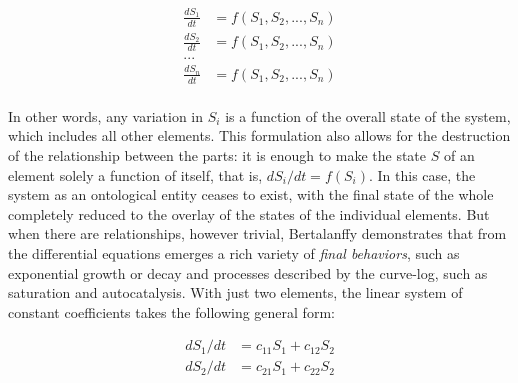 \documentclass[./main_en.tex]{subfiles}
\begin{document}
\begin{linenomath*}
\begin{equation}
\label{eq:systems}
\begin{split}
    \frac{dS_1}{dt} &= f(S_1, S_2, ..., S_n)\\
    \frac{dS_2}{dt} &= f(S_1, S_2, ..., S_n)\\
    ...\\
    \frac{dS_n}{dt} &= f(S_1, S_2, ..., S_n)\\
\end{split}
\end{equation}
\end{linenomath*}
In other words, any variation in $S_i$ is a function of the overall state of the \gls{system}, which includes all other elements. This formulation also allows for the destruction of the relationship between the parts: it is enough to make the state $S$ of an element solely a function of itself, that is,  $dS_i/dt = f(S_i)$. In this case, the \gls{system} as an ontological entity ceases to exist, with the final state of the whole completely reduced to the overlay of the states of the individual elements. But when there are relationships, however trivial, Bertalanffy demonstrates that from the differential equations emerges a rich variety of \textit{final behaviors}, such as exponential growth or decay and processes described by the \gls{curve-log}, such as saturation and autocatalysis. With just two elements, the linear \gls{system} of constant coefficients takes the following general form:
\begin{linenomath*}
\[
\begin{split}
    dS_1/dt &= c_{11}S_1 + c_{12}S_2\\
    dS_2/dt &= c_{21}S_1 + c_{22}S_2\\
\end{split}
\]
\end{linenomath*}
\end{document}

